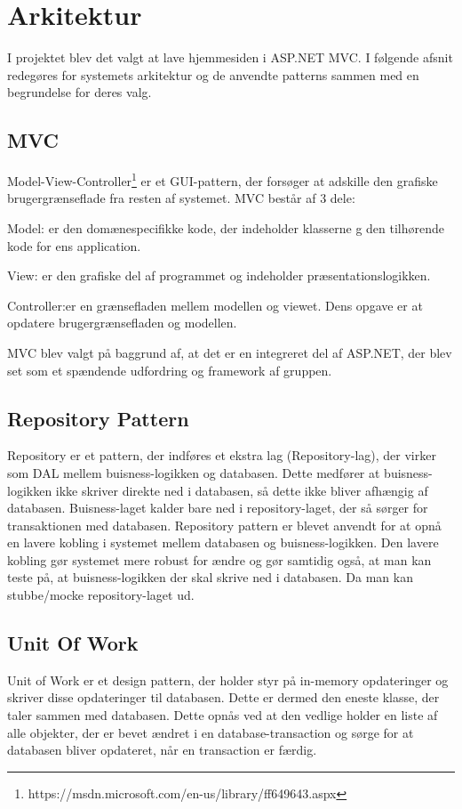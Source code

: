 \chapter{Arkitektur}

I projektet blev det valgt at lave hjemmesiden i ASP.NET MVC. I følgende afsnit redegøres for systemets arkitektur og de anvendte patterns sammen med en begrundelse for deres valg.

\section{MVC}
Model-View-Controller\footnote{https://msdn.microsoft.com/en-us/library/ff649643.aspx} er et GUI-pattern, der forsøger at adskille den grafiske brugergrænseflade fra resten af systemet. MVC består af 3 dele:

Model: er den domænespecifikke kode, der indeholder klasserne g den tilhørende kode for ens application.

View: er den grafiske del af programmet og indeholder præsentationslogikken.

Controller:er en grænsefladen mellem modellen og viewet. Dens opgave er at opdatere brugergrænsefladen og modellen.

MVC blev valgt på baggrund af, at det er en integreret del af ASP.NET, der blev set som et spændende udfordring og framework af gruppen. 

\section{Repository Pattern}
Repository er et pattern, der indføres et ekstra lag (Repository-lag), der virker som DAL mellem buisness-logikken og databasen. Dette medfører at buisness-logikken ikke skriver direkte ned i databasen, så dette ikke bliver afhængig af databasen. Buisness-laget kalder bare ned i repository-laget, der så sørger for transaktionen med databasen. 
Repository pattern er blevet anvendt for at opnå en lavere kobling i systemet mellem databasen og buisness-logikken. Den lavere kobling gør systemet mere robust for ændre og gør samtidig også, at man kan teste på, at buisness-logikken der skal skrive ned i databasen. Da man kan stubbe/mocke repository-laget ud.

\section{Unit Of Work}
Unit of Work er et design pattern, der holder styr på in-memory opdateringer og skriver disse opdateringer til databasen. Dette er dermed den eneste klasse, der taler sammen med databasen.
Dette opnås ved at den vedlige holder en liste af alle objekter, der er bevet ændret i en database-transaction og sørge for at databasen bliver opdateret, når en transaction er færdig.